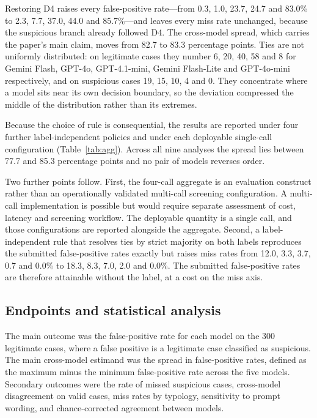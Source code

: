 \documentclass[pdflatex,sn-basic,Numbered]{sn-jnl}
\newcommand{\HLtext}[1]{\texthl{#1}}
\newcommand{\HLdel}[1]{\textcolor{HLink}{\sout{#1}}}
\renewcommand{\HLtext}[1]{#1}\renewcommand{\HLdel}[1]{#1}%
\begin{document}
\HLtext{Restoring D4 raises every false-positive rate---from 0.3, 1.0, 23.7, 24.7 and 83.0}\% \HLtext{to 2.3, 7.7, 37.0, 44.0 and 85.7}\%\HLtext{---and leaves every miss rate unchanged, because the suspicious branch already followed D4. The cross-model spread, which carries the paper's main claim, moves from 82.7 to 83.3 percentage points. Ties are not uniformly distributed: on legitimate cases they number 6, 20, 40, 58 and 8 for Gemini Flash, GPT-4o, GPT-4.1-mini, Gemini Flash-Lite and GPT-4o-mini respectively, and on suspicious cases 19, 15, 10, 4 and 0. They concentrate where a model sits near its own decision boundary, so the deviation compressed the middle of the distribution rather than its extremes.}

\HLtext{Because the choice of rule is consequential, the results are reported under four further label-independent policies and under each deployable single-call configuration} (Table~\ref{tab:agg}\HLtext{). Across all nine analyses the spread lies between 77.7 and 85.3 percentage points and no pair of models reverses order.}

\HLtext{Two further points follow. First, the four-call aggregate is an evaluation construct rather than an operationally validated multi-call screening configuration. A multi-call implementation is possible but would require separate assessment of cost, latency and screening workflow. The deployable quantity is a single call, and those configurations are reported alongside the aggregate. Second, a label-independent rule that resolves ties by strict majority on both labels reproduces the submitted false-positive rates exactly but raises miss rates from 12.0, 3.3, 3.7, 0.7 and 0.0}\% \HLtext{to 18.3, 8.3, 7.0, 2.0 and 0.0}\%\HLtext{. The submitted false-positive rates are therefore attainable without the label, at a cost on the miss axis.}

\subsection{Endpoints and statistical analysis}

The main outcome was the false-positive rate for each model on the 300 legitimate cases, where a false positive is a legitimate case classified as suspicious. The main cross-model estimand was the spread in false-positive rates, defined as the maximum minus the minimum false-positive rate across the five models. Secondary outcomes were the rate of missed suspicious cases, cross-model disagreement on valid cases, miss rates by typology, sensitivity to prompt wording, and chance-corrected agreement between models.
\end{document}
